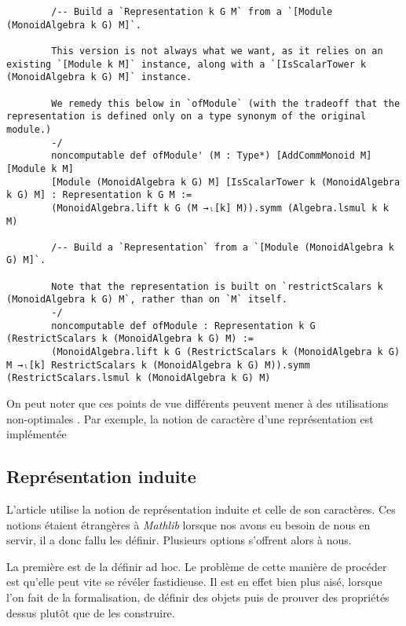 \documentclass[10pt]{article}
\theoremstyle{definition}
\begin{document}
\begin{center}
	\begin{tcolorbox}[title = $L\exists\forall N$,width=13cm,text width=13cm,colback=lightgray!30,
		colframe=gray,sharp corners,
		rounded corners=uphill ]
		\begin{lstlisting}
		/-- Build a `Representation k G M` from a `[Module (MonoidAlgebra k G) M]`.
		
		This version is not always what we want, as it relies on an existing `[Module k M]` instance, along with a `[IsScalarTower k (MonoidAlgebra k G) M]` instance.
		
		We remedy this below in `ofModule` (with the tradeoff that the representation is defined only on a type synonym of the original module.)
		-/
		noncomputable def ofModule' (M : Type*) [AddCommMonoid M] [Module k M]
		[Module (MonoidAlgebra k G) M] [IsScalarTower k (MonoidAlgebra k G) M] : Representation k G M :=
		(MonoidAlgebra.lift k G (M →ₗ[k] M)).symm (Algebra.lsmul k k M)
			
		/-- Build a `Representation` from a `[Module (MonoidAlgebra k G) M]`.
		
		Note that the representation is built on `restrictScalars k (MonoidAlgebra k G) M`,	rather than on `M` itself.
		-/
		noncomputable def ofModule : Representation k G (RestrictScalars k (MonoidAlgebra k G) M) :=
		(MonoidAlgebra.lift k G (RestrictScalars k (MonoidAlgebra k G) M →ₗ[k] RestrictScalars k (MonoidAlgebra k G) M)).symm	(RestrictScalars.lsmul k (MonoidAlgebra k G) M)
		\end{lstlisting}
	\end{tcolorbox}
\end{center}


On peut noter que ces points de vue différents peuvent mener à des utilisations \og non-optimales \fg. Par exemple, la notion de caractère d'une représentation est implémentée 


\subsection{Représentation induite}
L'article utilise la notion de représentation induite et celle de son caractères. Ces notions étaient étrangères à \textit{Mathlib} lorsque nos avons eu besoin de nous en servir, il a donc fallu les définir. Plusieurs options s'offrent alors à nous.
\newline

La première est de la définir ad hoc. Le problème de cette manière de procéder est qu'elle peut vite se révéler fastidieuse. Il est en effet bien plus aisé, lorsque l'on fait de la formalisation, de définir des objets puis de prouver des propriétés dessus plutôt que de les construire.
\newline
\end{document}
